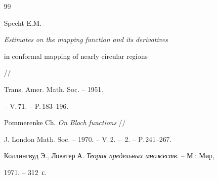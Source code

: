 \begin{thebibliography}{99}


Specht E.M.


{\em Estimates on the mapping function and its derivatives


in conformal mapping of nearly circular regions} //


Trans. Amer. Math. Soc. -- 1951.


-- V.\,71. -- P.\,183--196.




Pommerenke Ch. {\em On Bloch functions} //


J. London Math. Soc. -- 1970. -- V.\,2. -- \No\,2. -- P.\,241--267.




Коллингвуд Э., Ловатер А. {\em Теория предельных множеств}. -- М.: Мир,


1971. -- 312~с.





\end{thebibliography}





\vskip 0.3cm







\smallskip









\label{end}






